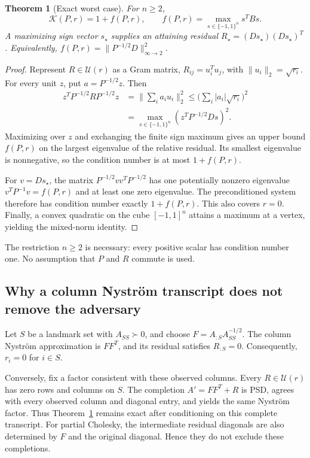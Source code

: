 \documentclass[11pt]{article}
\newtheorem{theorem}{Theorem}
\theoremstyle{definition}\newtheorem{definition}[theorem]{Definition}
\newcommand{\opt}{\mathcal K}
\begin{document}
\begin{theorem}[Exact worst case]\label{thm:exact}
For $n\ge2$,
\begin{equation}\label{eq:exact}
 \opt(P,r)=1+f(P,r),\qquad
 f(P,r)=\max_{s\in\{-1,1\}^n}s^TBs.
\end{equation}
A maximizing sign vector $s_\star$ supplies an attaining residual
$R_\star=(Ds_\star)(Ds_\star)^T$. Equivalently,
$f(P,r)=\|P^{-1/2}D\|_{\infty\to2}^2$.
\end{theorem}
\begin{proof}
Represent $R\in\mathcal U(r)$ as a Gram matrix, $R_{ij}=u_i^Tu_j$, with $\|u_i\|_2=\sqrt{r_i}$. For every unit $z$, put $a=P^{-1/2}z$. Then
\begin{align}
 z^TP^{-1/2}RP^{-1/2}z
 &=\Big\|\sum_i a_i u_i\Big\|_2^2
 \le\Big(\sum_i |a_i|\sqrt{r_i}\Big)^2\\
 &=\max_{s\in\{-1,1\}^n}(z^TP^{-1/2}Ds)^2.
\end{align}
Maximizing over $z$ and exchanging the finite sign maximum gives an upper bound $f(P,r)$ on the largest eigenvalue of the relative residual. Its smallest eigenvalue is nonnegative, so the condition number is at most $1+f(P,r)$.

For $v=Ds_\star$, the matrix $P^{-1/2}vv^TP^{-1/2}$ has one potentially nonzero eigenvalue $v^TP^{-1}v=f(P,r)$ and at least one zero eigenvalue. The preconditioned system therefore has condition number exactly $1+f(P,r)$. This also covers $r=0$. Finally, a convex quadratic on the cube $[-1,1]^n$ attains a maximum at a vertex, yielding the mixed-norm identity.
\end{proof}
The restriction $n\ge2$ is necessary: every positive scalar has condition number one. No assumption that $P$ and $R$ commute is used.

\subsection{Why a column Nystr\"om transcript does not remove the adversary}
Let $S$ be a landmark set with $A_{SS}\succ0$, and choose $F=A_{:S}A_{SS}^{-1/2}$. The column Nystr\"om approximation is $FF^T$, and its residual satisfies $R_{:S}=0$. Consequently, $r_i=0$ for $i\in S$.

Conversely, fix a factor consistent with these observed columns. Every $R\in\mathcal U(r)$ has zero rows and columns on $S$. The completion $A'=FF^T+R$ is PSD, agrees with every observed column and diagonal entry, and yields the same Nystr\"om factor. Thus Theorem~\ref{thm:exact} remains exact after conditioning on this complete transcript. For partial Cholesky, the intermediate residual diagonals are also determined by $F$ and the original diagonal. Hence they do not exclude these completions.
\end{document}
